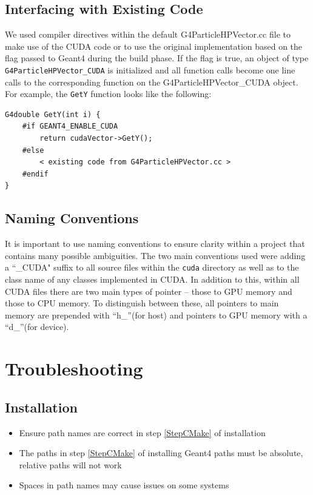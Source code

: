 \documentclass[12pt]{article}
\begin{document}
\subsection{Interfacing with Existing Code} %
We used compiler directives within the default G4ParticleHPVector.cc file to make use of the CUDA code or to use the original implementation based on the flag passed to Geant4 during the build phase. If the flag is true, an object of type \\\texttt{G4ParticleHPVector\_CUDA} is initialized and all function calls become one line calls to the corresponding function on the G4ParticleHPVector\_CUDA object. For example, the \texttt{GetY} function looks like the following:
\begin{lstlisting}
G4double GetY(int i) {
	#if GEANT4_ENABLE_CUDA
		return cudaVector->GetY();
	#else
		< existing code from G4ParticleHPVector.cc >
	#endif
}
\end{lstlisting}

\subsection{Naming Conventions} %
It is important to use naming conventions to ensure clarity within a project that contains many possible ambiguities. The two main conventions used were adding a ``\_CUDA" suffix to all source files within the \texttt{cuda} directory as well as to the class name of any classes implemented in CUDA. In addition to this, within all CUDA files there are two main types of pointer -- those to GPU memory and those to CPU memory. To distinguish between these, all pointers to main memory are prepended with ``h\_''(for host) and pointers to GPU memory with a ``d\_''(for device).

\section{Troubleshooting}\label{SecTroubleshooting} %
\subsection{Installation} %
\begin{itemize}
\item Ensure path names are correct in step \ref{StepCMake} of installation
\item The paths in step \ref{StepCMake} of installing Geant4 paths must be absolute, relative paths will not work
\item Spaces in path names may cause issues on some systems
\end{itemize}
\end{document}
